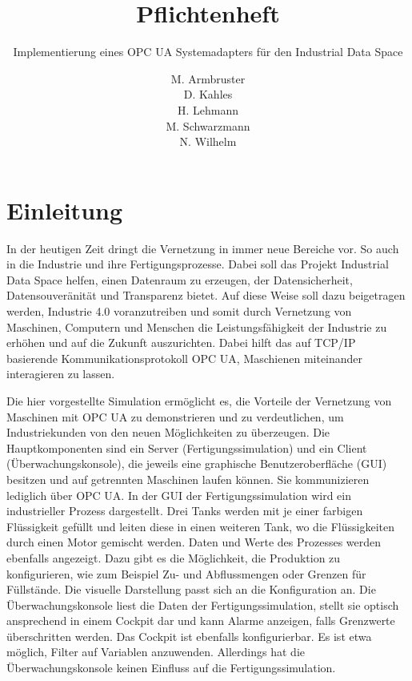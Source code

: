\documentclass[parskip=full]{scrartcl}
\title{Pflichtenheft}
\subtitle{Implementierung eines OPC UA Systemadapters für den Industrial Data Space}
\author{
    M. Armbruster\\
    D. Kahles\\
    H. Lehmann\\
    M. Schwarzmann\\
    N. Wilhelm
}
\begin{document}
\maketitle
\tableofcontents
\pagebreak

\section{Einleitung}
In der heutigen Zeit dringt die Vernetzung in immer neue Bereiche vor. So auch in die Industrie und ihre Fertigungsprozesse.
Dabei soll das Projekt Industrial Data Space helfen, einen Datenraum zu erzeugen, der Datensicherheit, Datensouveränität und
Transparenz bietet. Auf diese Weise soll dazu beigetragen werden, Industrie 4.0 voranzutreiben und somit durch Vernetzung von
Maschinen, Computern und Menschen die Leistungsfähigkeit der Industrie zu erhöhen und auf die Zukunft auszurichten.
Dabei hilft das auf TCP/IP basierende Kommunikationsprotokoll OPC UA, Maschienen miteinander interagieren zu lassen.

Die hier vorgestellte Simulation ermöglicht es, die Vorteile der Vernetzung von Maschinen mit OPC UA zu demonstrieren und zu verdeutlichen, um Industriekunden von den neuen Möglichkeiten zu überzeugen.
Die Hauptkomponenten sind ein Server (Fertigungssimulation) und ein Client (Überwachungskonsole),
die jeweils eine graphische Benutzeroberfläche (GUI) besitzen und auf getrennten Maschinen laufen können.
Sie kommunizieren lediglich über OPC UA.
In der GUI der Fertigungssimulation wird ein industrieller Prozess dargestellt.
Drei Tanks werden mit je einer farbigen Flüssigkeit gefüllt und leiten diese in einen weiteren Tank,
wo die Flüssigkeiten durch einen Motor gemischt werden. Daten und Werte des Prozesses werden ebenfalls angezeigt. Dazu gibt es
die Möglichkeit, die Produktion zu konfigurieren, wie zum Beispiel Zu- und Abflussmengen oder Grenzen für Füllstände.
Die visuelle Darstellung passt sich an die Konfiguration an.
Die Überwachungskonsole liest die Daten der Fertigungssimulation, stellt sie optisch ansprechend in einem Cockpit dar
und kann Alarme anzeigen, falls Grenzwerte überschritten werden. Das Cockpit ist ebenfalls konfigurierbar. Es ist etwa möglich, Filter auf Variablen anzuwenden. Allerdings hat die Überwachungskonsole keinen Einfluss auf die Fertigungssimulation.
      
\end{document}
